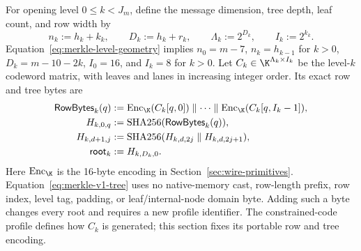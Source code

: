 For opening level $0\le k<J_m$, define the message dimension, tree depth,
leaf count, and row width by
\begin{equation}
 n_k:=h_k+k_k,\qquad D_k:=h_k+r_k,\qquad
 \Lambda_k:=2^{D_k},\qquad I_k:=2^{k_k}.
 \label{eq:merkle-level-geometry}
\end{equation}
Equation~\eqref{eq:merkle-level-geometry} implies
$n_0=m-7$, $n_k=h_{k-1}$ for $k>0$, $D_k=m-10-2k$,
$I_0=16$, and $I_k=8$ for $k>0$.  Let
$C_k\in\K^{\Lambda_k\times I_k}$ be the level-$k$ codeword matrix, with
leaves and lanes in increasing integer order.  Its exact row and tree bytes
are
\begin{equation}
 \begin{aligned}
  \mathsf{RowBytes}_k(q)
   &:=\operatorname{Enc}_{\K}(C_k[q,0])\parallel\cdots\parallel
      \operatorname{Enc}_{\K}(C_k[q,I_k-1]),\\
  H_{k,0,q}&:=\operatorname{SHA256}(\mathsf{RowBytes}_k(q)),\\
  H_{k,d+1,j}&:=\operatorname{SHA256}
      (H_{k,d,2j}\parallel H_{k,d,2j+1}),\\
  \mathsf{root}_k&:=H_{k,D_k,0}.
 \end{aligned}
 \label{eq:merkle-v1-tree}
\end{equation}
Here $\operatorname{Enc}_{\K}$ is the 16-byte encoding in
Section~\ref{sec:wire-primitives}.  Equation~\eqref{eq:merkle-v1-tree} uses
no native-memory cast, row-length prefix, row index, level tag, padding, or
leaf/internal-node domain byte.  Adding such a byte changes every root and
requires a new profile identifier.  The constrained-code profile defines
how $C_k$ is generated; this section fixes its portable row and tree encoding.

